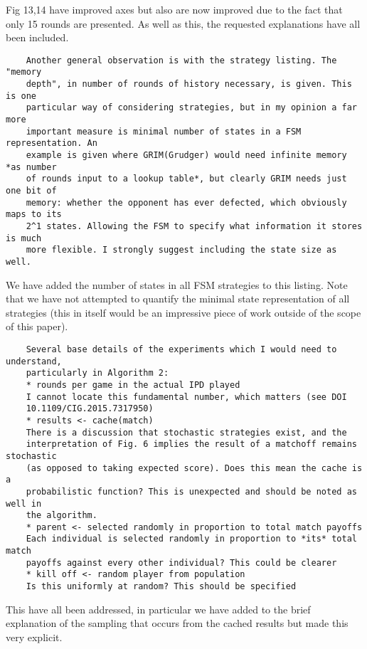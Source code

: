 \documentclass[a4]{article}
\begin{document}
Fig 13,14 have improved axes but also are now improved due to the fact that only
15 rounds are presented. As well as this, the requested explanations have all
been included.

\begin{verbatim}
    Another general observation is with the strategy listing. The "memory
    depth", in number of rounds of history necessary, is given. This is one
    particular way of considering strategies, but in my opinion a far more
    important measure is minimal number of states in a FSM representation. An
    example is given where GRIM(Grudger) would need infinite memory *as number
    of rounds input to a lookup table*, but clearly GRIM needs just one bit of
    memory: whether the opponent has ever defected, which obviously maps to its
    2^1 states. Allowing the FSM to specify what information it stores is much
    more flexible. I strongly suggest including the state size as well.
\end{verbatim}

We have added the number of states in all FSM strategies to this listing. Note
that we have not attempted to quantify the minimal state representation of all
strategies (this in itself would be an impressive piece of work outside of the
scope of this paper).

\begin{verbatim}
    Several base details of the experiments which I would need to understand,
    particularly in Algorithm 2:
    * rounds per game in the actual IPD played
    I cannot locate this fundamental number, which matters (see DOI
    10.1109/CIG.2015.7317950)
    * results <- cache(match)
    There is a discussion that stochastic strategies exist, and the
    interpretation of Fig. 6 implies the result of a matchoff remains stochastic
    (as opposed to taking expected score). Does this mean the cache is a
    probabilistic function? This is unexpected and should be noted as well in
    the algorithm.
    * parent <- selected randomly in proportion to total match payoffs
    Each individual is selected randomly in proportion to *its* total match
    payoffs against every other individual? This could be clearer
    * kill off <- random player from population
    Is this uniformly at random? This should be specified
\end{verbatim}

This have all been addressed, in particular we have added to the brief explanation
of the sampling that occurs from the cached results but made this very explicit.
\end{document}
